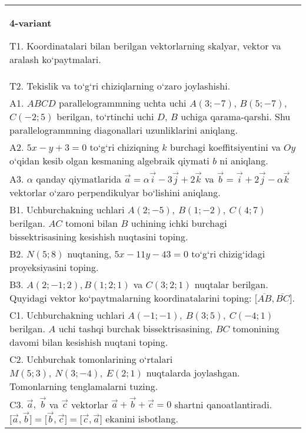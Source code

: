 \documentclass{article}
\begin{document}
\begin{tabular}{m{17cm}}
\textbf{4-variant}
\newline

T1. 
Koordinatalari bilan berilgan vektorlarning skalyar, vektor va aralash ko‘paytmalari. \\
T2. 
Tekislik va to‘g‘ri chiziqlarning o‘zaro joylashishi.
 \\
A1. 
$ABCD$ parallelogrammning uchta uchi $A (3; -7) $,
$B (5; -7) $, $C (-2; 5) $ berilgan, to‘rtinchi uchi $D$,
$B$ uchiga qarama-qarshi. Shu parallelogrammning diagonallari
uzunliklarini aniqlang.
 \\
A2. 
$5x-y+3=0$ to‘g‘ri chiziqning $k$ burchagi
koeffitsiyentini va $Oy$ o‘qidan kesib olgan kesmaning algebraik
qiymati $b$ ni aniqlang.
 \\
A3. 
$\alpha$
qanday qiymatlarida 
$\overrightarrow{a} = \alpha\overrightarrow{i} - 3\overrightarrow{j} + 2\overrightarrow{k}$
va
$\overrightarrow{b} = \overrightarrow{i} + 2\overrightarrow{j} - \alpha\overrightarrow{k}$
vektorlar o‘zaro perpendikulyar bo‘lishini aniqlang.
 \\
B1. 
Uchburchakning uchlari \(A (2;-5),\ B (1;-2),\ C (4;7) \)
berilgan. $AC$ tomoni bilan $B$ uchining ichki burchagi
bissektrisasining kesishish nuqtasini toping.
 \\
B2. 
\(N (5;8) \) nuqtaning, \(5x-11y-43=0\) to‘g‘ri chizig‘idagi
proyeksiyasini toping.
 \\
B3. 
$A (2; -1;2),B (1;2; 1) $ va $C (3;2;1)$ nuqtalar berilgan. Quyidagi vektor ko‘paytmalarning koordinatalarini toping:
$\lbrack\overline{AB},\overline{BC}\rbrack$.
 \\
C1. 
Uchburchakning uchlari
\(A (- 1; - 1),\ B (3;5),\ C (- 4;1) \) berilgan. $A$ uchi tashqi
burchak bissektrisasining, $BC$ tomonining davomi bilan kesishish
nuqtani toping.
 \\
C2. 
Uchburchak tomonlarining o‘rtalari
\(M (5;3),\ N (3; - 4),\ E (2;1) \) nuqtalarda joylashgan. Tomonlarning
tenglamalarni tuzing.
 \\
C3. 
\(\vec{a},\ \vec{b}\) va \(\vec{c}\) vektorlar \(\vec{a} + \vec{b} + \vec{c} = 0\) shartni qanoatlantiradi. \(\lbrack\vec{a},\vec{b}\rbrack = \lbrack\vec{b},\vec{c}\rbrack = \lbrack\vec{c},\vec{a}\rbrack\) ekanini isbotlang.
 \\

\end{tabular}
\vspace{1cm}
\end{document}
